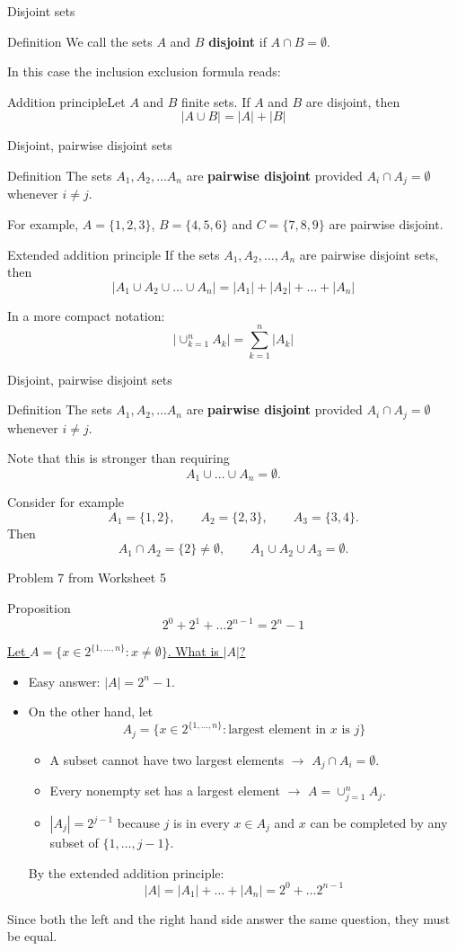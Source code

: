 \documentclass{beamer}
\def\bl[#1]#2{\begin{block}{#1}#2\end{block}}
\def\itemb{\begin{itemize}}
\def\iteme{\end{itemize}}
\begin{document}
\begin{frame}{Disjoint sets}
\bl[Definition]{
We call the sets $A$ and $B$ \textbf{disjoint} if $A\cap B=\emptyset$.}\pause
In this case the inclusion exclusion formula reads:
\bl[Addition principle]{Let $A$ and $B$ finite sets. If $A$ and $B$ are disjoint, then 
\[
|A\cup B|=|A|+|B|
\]}\pause
{}
\end{frame}

\begin{frame}{Disjoint, pairwise disjoint sets}

\bl[Definition]{
The sets $A_1, A_2,\dots A_n$ are \textbf{pairwise disjoint} provided $A_i\cap A_j=\emptyset$ whenever $i\neq j$.}\pause

For example, $A=\{1,2,3\}$, $B=\{4,5,6\}$ and $C=\{7,8,9\}$ are pairwise disjoint.\pause

\bl[Extended addition principle]{
If the sets $A_1,A_2,\dots,A_n$ are pairwise disjoint sets, then
\[
|A_1\cup A_2\cup\dots\cup A_n|=|A_1|+|A_2|+\dots+|A_n|
\]}\pause
In a more compact notation:
\[
\left|\cup_{k=1}^nA_k\right|=\sum_{k=1}^n|A_k|
\]
\end{frame}

\begin{frame}{Disjoint, pairwise disjoint sets}
\bl[Definition]{
The sets $A_1, A_2,\dots A_n$ are \textbf{pairwise disjoint} provided $A_i\cap A_j=\emptyset$ whenever $i\neq j$.}

Note that this is stronger than requiring
\[
A_1\cup...\cup A_n=\emptyset.
\]

Consider for example
\[
A_1=\{1,2\}, \qquad A_2=\{2,3\}, \qquad A_3=\{3,4\}.
\]
Then
\[
A_1\cap A_2=\{2\}\neq \emptyset,\qquad A_1\cup A_2\cup A_3=\emptyset.
\]
\end{frame}

\begin{frame}{Problem 7 from Worksheet 5}
\vspace{-0.2cm}

\bl[Proposition]{\vspace{-0.1cm}
\[
2^0+2^1+\dots 2^{n-1}=2^n-1
\]}

\underline{Let $A=\{x\in 2^{\{1,\dots, n\}}: x\neq\emptyset\}$. What is $|A|$?}
\vspace{0.1cm}
\itemb
\item Easy answer: $|A|=2^n-1$.
\item On the other hand, let
\[
A_j=\{x\in 2^{\{1,\dots, n\}}: \textrm{largest element in $x$ is $j$}\}
\]\vspace{-0.5cm}

\itemb
\item A subset cannot have two largest elements $\to$ $A_j\cap A_i=\emptyset$.
\item Every nonempty set has a largest element $\to$ $A=\cup_{j=1}^nA_j$.
\item $|A_j|=2^{j-1}$ because $j$ is in every $x\in A_j$ and $x$ can be completed by any subset of $\{1,\dots,j-1\}$.
\iteme
By the extended addition principle:
\[
|A|=|A_1|+\dots+|A_n|=2^0+\dots 2^{n-1}
\]
\iteme 
Since both the left and the right hand side answer the same question, they must be equal.
\end{frame}
\end{document}
